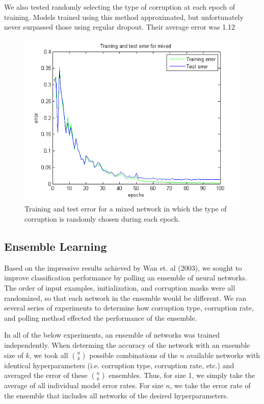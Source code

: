 \documentclass{article} %
\begin{document}
We also tested randomly selecting the type of corruption at each epoch of training. Models trained using this method approximated, but unfortunately never surpassed those using regular dropout. Their average error was 1.12%

\begin{figure}
\begin{center}
\includegraphics[width=\textwidth]{mixedTrainTestErr.png}
\caption{Training and test error for a mixed network in which the type of corruption is randomly chosen during each epoch.}
\label{fig:mixedError}
\end{center}
\end{figure}

\subsection{Ensemble Learning}
Based on the impressive results achieved by Wan et. al (2003), we sought to improve classification performance by polling an ensemble of neural networks. The order of input examples, initialization, and corruption masks were all randomized, so that each network in the ensemble would be different. We ran several series of experiments to determine how corruption type, corruption rate, and polling method effected the performance of the ensemble.

In all of the below experiments, an ensemble of networks was trained independently. When determing the accuracy of the network with an ensemble size of $k$, we took all $n \choose k$ possible combinations of the $n$ available networks with identical hyperparameters (i.e. corruption type, corruption rate, etc.) and averaged the error of these $n \choose k$ ensembles. Thus, for size 1, we simply take the average of all individual model error rates. For size $n$, we take the error rate of the ensemble that includes all networks of the desired hyperparameters.
\end{document}
